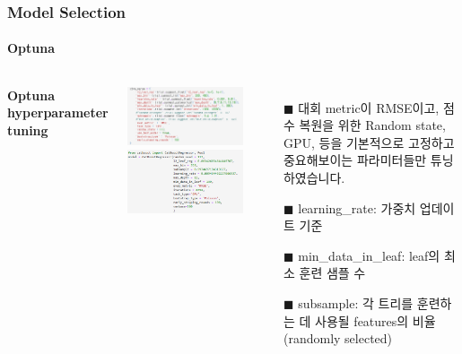 \documentclass{beamer}
\begin{document}
\begin{frame}
\frametitle{Model Selection}
\framesubtitle{Optuna}

\begin{columns}

\textbf{Optuna hyperparameter tuning }\par\medskip
\includegraphics[scale=0.4]{optuna tuning.png}\\

\includegraphics[scale=0.4]{best params.png}\\
\begin{itemize}
\item[$\blacksquare$] {\scriptsize 대회 metric이 RMSE이고, 점수 복원을 위한 Random state, GPU, 등을 기본적으로 고정하고 중요해보이는 파라미터들만 튜닝하였습니다.}\\
\item[$\blacksquare$] {\scriptsize learning\_rate: 가중치 업데이트 기준}\\
\item[$\blacksquare$] {\scriptsize min\_data\_in\_leaf: leaf의 최소 훈련 샘플 수}\\
\item[$\blacksquare$] {\scriptsize subsample: 각 트리를 훈련하는 데 사용될 features의 비율 (randomly selected)}
\end{itemize}
\end{columns}
\end{frame}
\end{document}

